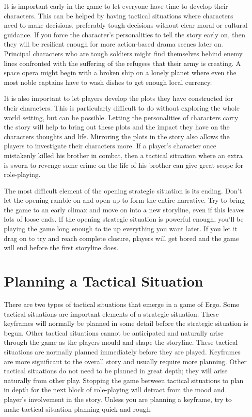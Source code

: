 \documentclass[twoside]{book}
\begin{document}
It is important early in the game to let everyone have time to develop
their characters. This can be helped by having tactical situations
where characters need to make decisions, preferably tough decisions
without clear moral or cultural guidance. If you force the character's
personalities to tell the story early on, then they will be resilient
enough for more action-based drama scenes later on. Principal
characters who are tough soldiers might find themselves behind enemy
lines confronted with the suffering of the refugees that their army is
creating. A space opera might begin with a broken ship on a lonely
planet where even the most noble captains have to wash dishes to get
enough local currency.

It is also important to let players develop the plots they have
constructed for their characters. This is particularly difficult to do
without exploring the whole world setting, but can be
possible. Letting the personalities of characters carry the story will
help to bring out these plots and the impact they have on the
characters thoughts and life. Mirroring the plots in the story also
allows the players to investigate their characters more. If a player's
character once mistakenly killed his brother in combat, then a
tactical situation where an extra is sworn to revenge some crime on
the life of his brother can give great scope for role-playing.

The most difficult element of the opening strategic situation is its
ending. Don't let the opening ramble on and open up to form the entire
narrative. Try to bring the game to an early climax and move on into a
new storyline, even if this leaves lots of loose ends. If the opening
strategic situation is powerful enough, you'll be playing the game
long enough to tie up everything you want later. If you let it drag on
to try and reach complete closure, players will get bored and the game
will end before the first storyline does.

\section{Planning a Tactical Situation}

There are two types of tactical situations that emerge in a game of
Ergo. Some tactical situations are important elements of a strategic
situation. These keyframes will normally be planned in some detail
before the strategic situation is begun. Other tactical situations
cannot be anticipated and naturally arise through the game as the
players mould and shape the storyline. These tactical situations are
normally planned immediately before they are played. Keyframes are
more significant to the overall story and usually require more
planning. Other tactical situations do not need to be planned in great
depth; they will arise naturally from other play. Stopping the game
between tactical situations to plan in depth for the next block of
role-playing will detract from the mood and player's involvement in
the story. Unless you are planning a keyframe, try to make tactical
situation planning quick and rough.
\end{document}

